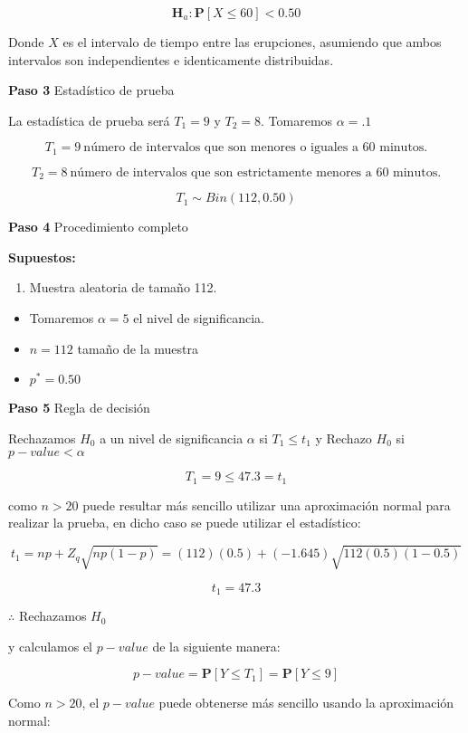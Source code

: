 \documentclass[
  a4paper,
  oneside,
  openany]{book}
\providecommand{\tightlist}{%
  \setlength{\itemsep}{0pt}\setlength{\parskip}{0pt}}
\begin{document}
\[\textbf{H}_a:  \mathbf{P}[X \leq 60]<0.50\]

Donde \(X\) es el intervalo de tiempo entre las erupciones, asumiendo que ambos intervalos son independientes e identicamente distribuidas.

\textbf{Paso 3} Estadístico de prueba

La estadística de prueba será \(T_1=9\) y \(T_2=8\). Tomaremos \(\alpha=.1\)

\[T_{1}=9 \ \mbox{número  de  intervalos que  son menores o iguales  a 60 minutos.}\]

\[T_{2}=8 \ \mbox{número  de  intervalos que  son estrictamente menores a 60 minutos.}\]

\[T_{1}\sim Bin(112,0.50)\]

\textbf{Paso 4} Procedimiento completo

\textbf{Supuestos:}

\begin{enumerate}
\def\labelenumi{\arabic{enumi}.}
\tightlist
\item
  Muestra aleatoria de tamaño 112.
\end{enumerate}

\begin{itemize}
\item
  Tomaremos \(\alpha = 5%
  \) el nivel de significancia.
\item
  \(n = 112\) tamaño de la muestra
\item
  \(p^* = 0.50\)
\end{itemize}

\textbf{Paso 5} Regla de decisión

Rechazamos \(H_0\) a un nivel de significancia \(\alpha\) si \(T_{1} \leq t_{1}\) y Rechazo \(H_0\) si \(p-value<\alpha\)

\[T_{1}=9 \leq 47.3=t_{1}\]

como \(n>20\) puede resultar más sencillo utilizar una aproximación normal para realizar la prueba, en dicho caso se puede utilizar el estadístico:

\[t_{1}=np+Z_{q}\sqrt{np(1-p)}=(112)(0.5)+(-1.645)\sqrt{112(0.5)(1-0.5)}\]

\[t_{1}=47.3\]

\(\therefore\) Rechazamos \(H_0\)

y calculamos el \(p-value\) de la siguiente manera:

\[p-value= \mathbf{P}[Y\leq T_{1}]=\mathbf{P}[Y\leq 9]\]

Como \(n > 20\), el \(p-value\) puede obtenerse más sencillo usando la aproximación normal:
\end{document}
